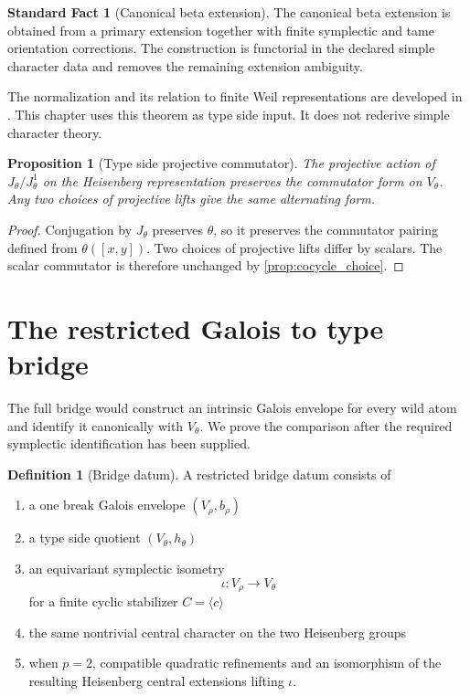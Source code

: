 \documentclass[11pt]{amsart}
\newtheorem{proposition}[proposition]{Proposition}
\theoremstyle{definition}
\newtheorem{definition}[definition]{Definition}
\newtheorem{standardfact}[standardfact]{Standard Fact}
\theoremstyle{remark}
\begin{document}
\begin{standardfact}[Canonical beta extension]\label{fact:canonical_beta}
The canonical beta extension is obtained from a primary extension together with finite symplectic and tame orientation corrections. The construction is functorial in the declared simple character data and removes the remaining extension ambiguity.
\end{standardfact}

The normalization and its relation to finite Weil representations are developed in \cite{Blondel2012,Dotto2022}. This chapter uses this theorem as type side input. It does not rederive simple character theory.

\begin{proposition}[Type side projective commutator]\label{prop:type_commutator}
The projective action of \(J_\theta/J_\theta^1\) on the Heisenberg representation preserves the commutator form on \(V_\theta\). Any two choices of projective lifts give the same alternating form.
\end{proposition}

\begin{proof}
Conjugation by \(J_\theta\) preserves \(\theta\), so it preserves the commutator pairing defined from \(\theta([x,y])\). Two choices of projective lifts differ by scalars. The scalar commutator is therefore unchanged by \cref{prop:cocycle_choice}.
\end{proof}

\section{The restricted Galois to type bridge}\label{sec:bridge}

The full bridge would construct an intrinsic Galois envelope for every wild atom and identify it canonically with \(V_\theta\). We prove the comparison after the required symplectic identification has been supplied.

\begin{definition}[Bridge datum]\label{def:bridge_datum}
A restricted bridge datum consists of

\begin{enumerate}
\item a one break Galois envelope \((V_\rho,b_\rho)\)
\item a type side quotient \((V_\theta,h_\theta)\)
\item an equivariant symplectic isometry
\[
\iota:V_\rho\longrightarrow V_\theta
\]
for a finite cyclic stabilizer \(C=\langle c\rangle\)
\item the same nontrivial central character on the two Heisenberg groups
\item when \(p=2\), compatible quadratic refinements and an isomorphism of the resulting Heisenberg central extensions lifting \(\iota\).
\end{enumerate}
\end{definition}
\end{document}
